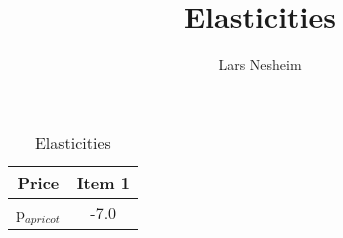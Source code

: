 \documentclass[11pt]{article}
\title{Elasticities}
\author{Lars Nesheim}
\date{}
\begin{document}
\maketitle

\begin{table}[h]
\caption{Elasticities}
\label{Table: elasticities}
\begin{center}
\begin{tabular}{cc}
Price & Item 1 \\ \hline
p$_{apricot}$ & -7.0 \\ \hline
\end{tabular}
\end{center}
\end{table}%
\end{document}
